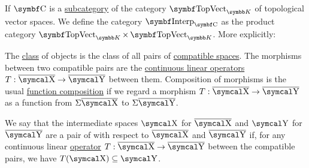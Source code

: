 \begin{definition}
\begin{DefEnum}
     If \( \Cat{C} \) is a \hyperref[def:subcategory]{subcategory} of the category \hyperref[def:category_of_topological_vector_spaces]{\( \Cat{TopVect}_{\BK} \)} of topological vector spaces. We define the category \( \Cat{Interp}_{\Cat{C}} \) as the product category \( \Cat{TopVect}_{\BK} \times \Cat{TopVect}_{\BK} \). More explicitly:
    \begin{RefList}
       The \hyperref[def:set_zfc]{class} of objects is the class of all pairs of \hyperref[def:interpolated_topological_vector_space/compatibility]{compatible spaces}.
       The morphisms between two compatible pairs are the \hyperref[def:interpolated_topological_vector_space/morphisms]{continuous linear operators} \( T: \Ol{\CX} \to \Ol{\CY} \) between them.
       Composition of morphisms is the usual \hyperref[def:function/composition]{function composition} if we regard a morphism \( T: \Ol{\CX} \to \Ol{\CY} \) as a function from \( \Sigma \Ol{\CX} \) to \( \Sigma \Ol{\CY} \).
    \end{RefList}

     We say that the intermediate spaces \( \CX \) for \( \Ol{\CX} \) and \( \CY \) for \( \Ol{\CY} \) are a pair of  with respect to \( \Ol{\CX} \) and \( \Ol{\CY} \) if, for any continuous linear \hyperref[def:interpolated_topological_vector_space/morphisms]{operator} \( T: \Ol{\CX} \to \Ol{\CY} \) between the compatible pairs, we have \( T(\CX) \subseteq \CY \).
  \end{DefEnum}
\end{definition}

